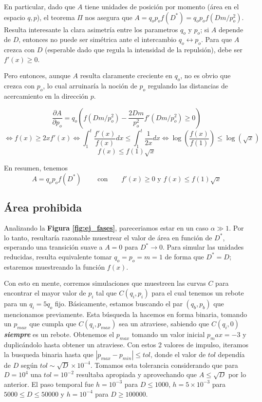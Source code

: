 \documentclass[twoside, 12pt]{article}
\providecommand{\dpart}[2]{\frac{\partial#1}{\partial#2}}
\begin{document}
En particular, dado que $A$ tiene unidades de posición por momento (área en el espacio $q,p$), el teorema $\Pi$ nos asegura que $A = q_op_o f(D^*) = q_op_o f(Dm/p_o^2)$.
Resulta interesante la clara asimetría entre los parametros $q_o$ y $p_o$; si $A$ depende de $D$, entonces no puede ser simétrica ante el intercambio $q_o \leftrightarrow p_o$.
Para que $A$ crezca con $D$ (esperable dado que regula la intensidad de la repulsión), debe ser $f'(x)\geq 0$.

Pero entonces, aunque $A$ resulta claramente creciente en $q_o$, no es obvio que crezca con $p_o$, lo cual arruinaría la noción de $p_o$ regulando las distancias de acercamiento en la dirección $p$.

\[ \dpart{A}{p_o} = q_o\left( f(Dm/p_o^2) - \frac{2Dm}{p_o^2}f'(Dm/p_o^2) \geq 0 \right) \]
\[ \Longleftrightarrow f(x) \geq 2x f'(x) \Longleftrightarrow  \int_1^t \frac{f'(x)}{f(x)}dx \leq \int_1^t\frac{1}{2x}dx \Longleftrightarrow \log{\left(\frac{f(x)}{f(1)}\right)} \leq \log{(\sqrt{x})} \]
\[ f(x) \leq f(1) \sqrt{x}\]

En resumen, tenemos
\[A = q_op_of(D^*) \qquad \text{ con} \qquad f'(x)\geq 0 \text{ y } f(x)\leq f(1)\sqrt{x} \]


\subsection{Área prohibida}

Analizando la \textbf{Figura \ref{fig:ej_fases}}, pareceriamos estar en un caso $\alpha \gg 1$.
Por lo tanto, resultaría razonable muestrear el valor de área en función de $D^*$, esperando una transición suave a $A=0$ para $D^* \rightarrow 0$.
Para simular las unidades reducidas, resulta equivalente tomar $q_o = p_o = m = 1$ de forma que $D^* = D$; estaremos muestreando la función $f(x)$.

Con esto en mente, corremos simulaciones que muestreen las curvas $C$ para encontrar el mayor valor de $p_i$ tal que $C(q_i, p_i)$ para el cual tenemos un rebote para un $q_i=5q_o$ fijo.
Básicamente, estamos buscando el par $(q_b, p_b)$ que mencionamos previamente.
Esta búsqueda la hacemos en forma binaria, tomando un $p_{max}$ que cumpla que $C(q_i, p_{max})$ sea un atraviese, sabiendo que $C(q_i, 0)$ \textbf{\textit{siempre}} es un rebote.
Obtenemos el $p_{max}$ tomando un valor inicial $p_max = -3$ y duplicándolo hasta obtener un atraviese.
Con estos 2 valores de impulso, iteramos la busqueda binaria hasta que $|p_{max}-p_{min}|\leq tol$, donde el valor de $tol$ dependía de $D$ según $tol \sim \sqrt{D}\times 10^{-4}$.
Tomamos esta tolerancia considerando que para $D=10^4$ una $tol = 10^{-2}$ resultaba apropiada y aprovechando que $A\leq \sqrt{D}$ por lo anterior.
El paso temporal fue $h=10^{-3}$ para $D\leq 1000$, $h=5\times10^{-3}$ para $5000\leq D\leq 50000$ y $h=10^{-4}$ para $D\geq 100000$.
\end{document}

